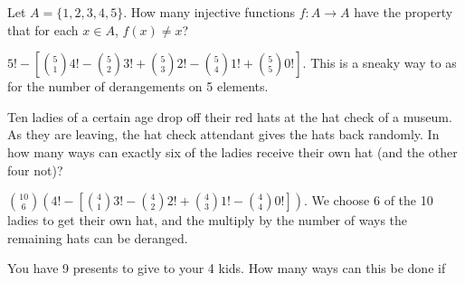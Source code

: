 \begin{questions}
	


\question Let $A = \{1,2,3,4,5\}$.  How many injective functions $f:A \to A$ have the property that for each $x \in A$, $f(x) \ne x$?

	\begin{answer}
	$5! - \left[{5 \choose 1}4! - {5 \choose 2}3! + {5 \choose 3}2! - {5 \choose 4}1! + {5 \choose 5}0!\right]$.  This is a sneaky way to as for the number of derangements on 5 elements. %
	\end{answer}
	
	


\question Ten ladies of a certain age drop off their red hats at the hat check of a museum.  As they are leaving, the hat check attendant gives the hats back randomly.  In how many ways can exactly six of the ladies receive their own hat (and the other four not)?

	\begin{answer}
	${10 \choose 6}\left(4! - \left[{4 \choose 1} 3! - {4 \choose 2}2! + {4 \choose 3}1! - {4 \choose 4}0!\right]\right)$.  We choose 6 of the 10 ladies to get their own hat, and the multiply by the number of ways the remaining hats can be deranged. 
	\end{answer}
	
	



	


\question You have 9 presents to give to your 4 kids.  How many ways can this be done if


\end{questions}
